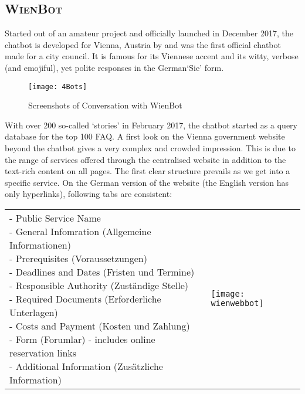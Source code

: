 \clearpage
\subsection{\textsc{WienBot}}
Started out of an amateur project and officially launched in December 2017, the chatbot is developed for Vienna, Austria by 
and was the first official chatbot made for a city council. It is famous for its Viennese accent and its witty, verbose (and emojiful), yet polite responses in the German`Sie' form.




\begin{figure}[h!]
	\label{wienbot:introscreenshots}
	\caption[Conversation with WienBot]{Screenshots of Conversation with WienBot}
	\texttt{[image: 4Bots]}
\end{figure}

With over 200 so-called `stories' in February 2017, the chatbot started as a query database for the top 100 FAQ.
A first look on the Vienna government website beyond the chatbot gives a very complex and crowded impression. This is due to the range of services offered through the centralised website in addition to the text-rich content on all pages. The first clear structure prevails as we get into a specific service. On the German version of the website (the English version has only hyperlinks), following tabs are consistent:



\begin{table}[h]
	\begin{tabular} {l l}

\shortstack[l]{
- Public Service Name\\
- General Infomration (Allgemeine Informationen)\\
- Prerequisites (Voraussetzungen)\\
- Deadlines and Dates (Fristen und Termine)\\
- Responsible Authority (Zuständige Stelle)\\
- Required Documents (Erforderliche Unterlagen)\\
- Costs and Payment (Kosten und Zahlung)\\
- Form (Forumlar) - includes online reservation links\\
- Additional Information (Zusätzliche Information)
}

&
\texttt{[image: wienwebbot]}
	\end{tabular}	
\end{table}



